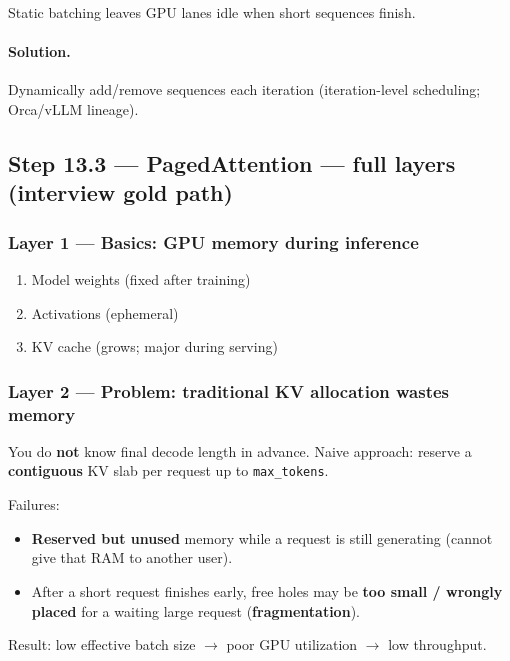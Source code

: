 \documentclass[11pt,a4paper]{article}
\begin{document}
Static batching leaves GPU lanes idle when short sequences finish.


\paragraph{Solution.}

Dynamically add/remove sequences each iteration (iteration-level scheduling; Orca/vLLM lineage).


\subsection{Step 13.3 --- PagedAttention --- full layers (interview gold path)}


\subsubsection{Layer 1 --- Basics: GPU memory during inference}

\begin{enumerate}
\item Model weights (fixed after training)  
\item Activations (ephemeral)  
\item KV cache (grows; major during serving)
\end{enumerate}


\subsubsection{Layer 2 --- Problem: traditional KV allocation wastes memory}

You do \textbf{not} know final decode length in advance. Naive approach: reserve a \textbf{contiguous} KV slab per request up to \texttt{max\_tokens}.


Failures:

\begin{itemize}
\item \textbf{Reserved but unused} memory while a request is still generating (cannot give that RAM to another user).  
\item After a short request finishes early, free holes may be \textbf{too small / wrongly placed} for a waiting large request (\textbf{fragmentation}).
\end{itemize}


Result: low effective batch size $\rightarrow$ poor GPU utilization $\rightarrow$ low throughput.
\end{document}
